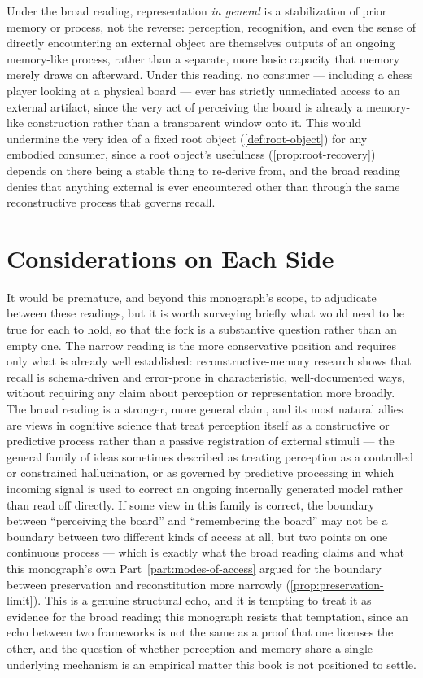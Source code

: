 Under the broad reading, representation \emph{in general} is a
stabilization of prior memory or process, not the reverse: perception,
recognition, and even the sense of directly encountering an external
object are themselves outputs of an ongoing memory-like process, rather
than a separate, more basic capacity that memory merely draws on
afterward. Under this reading, no consumer --- including a chess player
looking at a physical board --- ever has strictly unmediated access to an
external artifact, since the very act of perceiving the board is already
a memory-like construction rather than a transparent window onto it. This
would undermine the very idea of a fixed root object
(\cref{def:root-object}) for any embodied consumer, since a root object's
usefulness (\cref{prop:root-recovery}) depends on there being a stable
thing to re-derive from, and the broad reading denies that anything
external is ever encountered other than through the same reconstructive
process that governs recall.

\section{Considerations on Each Side}

It would be premature, and beyond this monograph's scope, to adjudicate
between these readings, but it is worth surveying briefly what would need
to be true for each to hold, so that the fork is a substantive question
rather than an empty one. The narrow reading is the more conservative
position and requires only what is already well established:
reconstructive-memory research shows that recall is schema-driven and
error-prone in characteristic, well-documented ways, without requiring
any claim about perception or representation more broadly. The broad
reading is a stronger, more general claim, and its most natural allies
are views in cognitive science that treat perception itself as a
constructive or predictive process rather than a passive registration of
external stimuli --- the general family of ideas sometimes described as
treating perception as a controlled or constrained hallucination, or as
governed by predictive processing in which incoming signal is used to
correct an ongoing internally generated model rather than read off
directly. If some view in this family is correct, the boundary between
``perceiving the board'' and ``remembering the board'' may not be a
boundary between two different kinds of access at all, but two points on
one continuous process --- which is exactly what the broad reading
claims and what this monograph's own Part~\ref{part:modes-of-access}
argued for the boundary between preservation and reconstitution more
narrowly (\cref{prop:preservation-limit}). This is a genuine structural
echo, and it is tempting to treat it as evidence for the broad reading;
this monograph resists that temptation, since an echo between two
frameworks is not the same as a proof that one licenses the other, and
the question of whether perception and memory share a single underlying
mechanism is an empirical matter this book is not positioned to settle.

